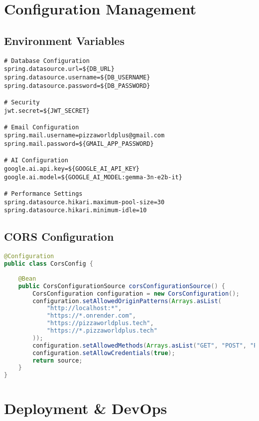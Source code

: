 \documentclass[11pt,a4paper]{article}
\begin{document}
\section{Configuration Management}

\subsection{Environment Variables}

\begin{lstlisting}[language=properties, caption=Application Configuration]
# Database Configuration
spring.datasource.url=${DB_URL}
spring.datasource.username=${DB_USERNAME}
spring.datasource.password=${DB_PASSWORD}

# Security
jwt.secret=${JWT_SECRET}

# Email Configuration  
spring.mail.username=pizzaworldplus@gmail.com
spring.mail.password=${GMAIL_APP_PASSWORD}

# AI Configuration
google.ai.api.key=${GOOGLE_AI_API_KEY}
google.ai.model=${GOOGLE_AI_MODEL:gemma-3n-e2b-it}

# Performance Settings
spring.datasource.hikari.maximum-pool-size=30
spring.datasource.hikari.minimum-idle=10
\end{lstlisting}

\subsection{CORS Configuration}

\begin{lstlisting}[language=java, caption=CORS Setup]
@Configuration
public class CorsConfig {
    
    @Bean
    public CorsConfigurationSource corsConfigurationSource() {
        CorsConfiguration configuration = new CorsConfiguration();
        configuration.setAllowedOriginPatterns(Arrays.asList(
            "http://localhost:*",
            "https://*.onrender.com", 
            "https://pizzaworldplus.tech",
            "https://*.pizzaworldplus.tech"
        ));
        configuration.setAllowedMethods(Arrays.asList("GET", "POST", "PUT", "DELETE"));
        configuration.setAllowCredentials(true);
        return source;
    }
}
\end{lstlisting}

\section{Deployment & DevOps}
\end{document}
